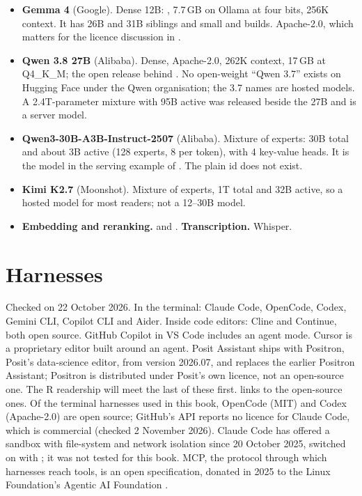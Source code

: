 \begin{itemize}
  \item \textbf{Gemma 4} (Google). Dense 12B: , 7.7\,GB on
    Ollama at four bits, 256K context. It has 26B and 31B siblings and small
     and  builds. Apache-2.0, which matters for the
    licence discussion in .
  \item \textbf{Qwen 3.8 27B} (Alibaba). Dense, Apache-2.0, 262K context,
    17\,GB at Q4\_K\_M; the open release behind \textcite{willison2026qwen38}.
    No open-weight ``Qwen 3.7'' exists on Hugging Face under the Qwen
    organisation; the 3.7 names are hosted models. A 2.4T-parameter mixture
    with 95B active was released beside the 27B and is a server model.
  \item \textbf{Qwen3-30B-A3B-Instruct-2507} (Alibaba). Mixture of experts:
    30B total and about 3B active (128 experts, 8 per token), with 4
    key-value heads. It is the model in the serving example of
    . The plain  id does not
    exist.
  \item \textbf{Kimi K2.7} (Moonshot). Mixture of experts, 1T total and 32B
    active, so a hosted model for most readers; not a 12--30B model.
  \item \textbf{Embedding and reranking.}  and
    . \textbf{Transcription.} Whisper.
\end{itemize}

\section{Harnesses}

Checked on 22 October 2026. In the terminal: Claude Code, OpenCode, Codex,
Gemini CLI, Copilot CLI and Aider. Inside code editors: Cline and Continue,
both open source. GitHub Copilot in VS Code includes an agent mode. Cursor is
a proprietary editor built around an agent. Posit Assistant ships with
Positron, Posit's data-science editor, from version 2026.07, and replaces the
earlier Positron Assistant; Positron is distributed under Posit's own licence,
not an open-source one. The R readership will meet the last of these first.
 links to the open-source ones. Of the terminal harnesses
used in this book, OpenCode (MIT) and Codex (Apache-2.0) are open source;
GitHub's API reports no licence for Claude Code, which is commercial (checked
2 November 2026). Claude Code has offered a sandbox with file-system and
network isolation since 20 October 2025, switched on with 
\parencite{anthropic2025sandboxing}; it was not tested for this book. MCP, the protocol through which harnesses reach tools, is an
open specification, donated in 2025 to the Linux Foundation's Agentic AI
Foundation \parencite{liu2026claudecode}.

